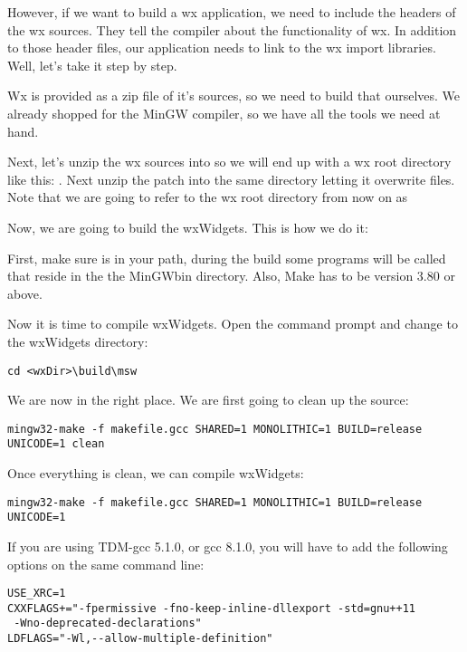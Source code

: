 However, if we want to build a wx application, we need to include the headers of the wx sources. They tell the compiler about the functionality of wx. In addition to those header files, our application needs to link to the wx import libraries. Well, let's take it step by step.

Wx is provided as a zip file of it's sources, so we need to build that ourselves. We already shopped for the MinGW compiler, so we have all the tools we need at hand.

Next, let's unzip the wx sources into  so we will end up with a wx root directory like this: . Next unzip the patch into the same directory letting it overwrite files. Note that we are going to refer to the wx root directory from now on as 

Now, we are going to build the wxWidgets. This is how we do it:

First, make sure  is in your path, during the build some programs will be called that reside in the the MinGW\osp bin directory. Also, Make has to be version 3.80 or above.

Now it is time to compile wxWidgets. Open the command prompt and change to the wxWidgets directory:

\begin{verbatim}
cd <wxDir>\build\msw
\end{verbatim}

We are now in the right place. We are first going to clean up the source:

\begin{verbatim}
mingw32-make -f makefile.gcc SHARED=1 MONOLITHIC=1 BUILD=release UNICODE=1 clean
\end{verbatim}

Once everything is clean, we can compile wxWidgets:

\begin{verbatim}
mingw32-make -f makefile.gcc SHARED=1 MONOLITHIC=1 BUILD=release UNICODE=1
\end{verbatim}

If you are using TDM-gcc 5.1.0, or gcc 8.1.0, you will have to add the following options on the same command line: 
\begin{verbatim}
USE_XRC=1
CXXFLAGS+="-fpermissive	-fno-keep-inline-dllexport -std=gnu++11
 -Wno-deprecated-declarations"
LDFLAGS="-Wl,--allow-multiple-definition"
\end{verbatim}  


